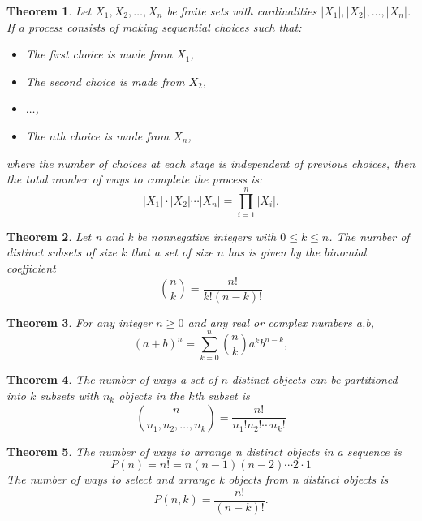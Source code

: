 \documentclass{article}
\newtheorem{theorem}{Theorem}[section]
\theoremstyle{definition}
\theoremstyle{remark}
\begin{document}
\begin{theorem}
Let \( X_1, X_2, \dots, X_n \) be finite sets with cardinalities \( |X_1|, |X_2|, \dots, |X_n| \). If a process consists of making sequential choices such that:
\begin{itemize}
\item The first choice is made from \( X_1 \),
\item The second choice is made from \( X_2 \),
\item \(\dots\),
\item The \( n \)th choice is made from \( X_n \),
\end{itemize}
where the number of choices at each stage is independent of previous choices, then the total number of ways to complete the process is:
\[
|X_1| \cdot |X_2| \cdots |X_n| = \prod_{i=1}^{n} |X_i|.
\]
\end{theorem}



\begin{theorem} \label{thm:binomial coefficient}
Let n and k be nonnegative integers with \( 0 \leq k \leq n\). The number of distinct subsets of size \(k\) that a set of size \(n\) has is given by the binomial coefficient
\[
\binom{n}{k} = \frac{n!}{k!(n-k)!}
\]

\end{theorem}

\begin{theorem} \label{thm:binomial theorem}
For any integer \(n \geq 0\) and any real or complex numbers a,b, 
\[
(a+b)^n = \sum^n_{k=0}{\binom{n}{k} a^{k}b^{n-k}},
\]


\end{theorem}

\begin{theorem}
The number of ways a set of $n$ distinct objects 
can be partitioned into $k$ subsets with 
$n_k$ objects in the $k$th subset is
\[
\binom{n}{n_1,n_2,\dots, n_k} = \frac{n!}{n_1!n_2!\cdots n_k!}
\]
\end{theorem}


\begin{theorem} \label{thm:permutations}
The number of ways to arrange n distinct objects in a sequence is 
\[
P(n) = n! = n(n-1)(n-2) \cdots 2 \cdot 1
\]
The number of ways to select and arrange k objects from n distinct objects is
\[
P(n,k) = \frac{n!}{(n-k)!}.
\]
\end{theorem}
\end{document}
